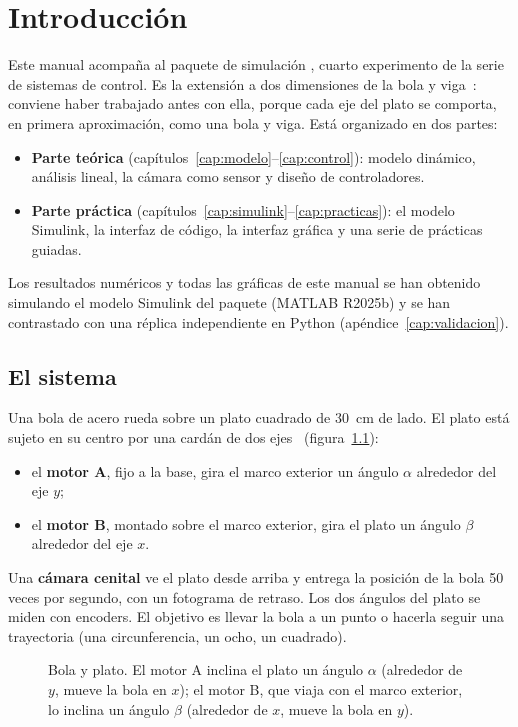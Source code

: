 \chapter{Introducción}
\label{cap:intro}

Este manual acompaña al paquete de simulación , cuarto experimento de la serie de sistemas de control. Es la extensión a dos dimensiones de la bola y viga~\cite{viga}: conviene haber trabajado antes con ella, porque cada eje del plato se comporta, en primera aproximación, como una bola y viga. Está organizado en dos partes:
\begin{itemize}
  \item \textbf{Parte teórica} (capítulos~\ref{cap:modelo}--\ref{cap:control}): modelo dinámico, análisis lineal, la cámara como sensor y diseño de controladores.
  \item \textbf{Parte práctica} (capítulos~\ref{cap:simulink}--\ref{cap:practicas}): el modelo Simulink, la interfaz de código, la interfaz gráfica y una serie de prácticas guiadas.
\end{itemize}
Los resultados numéricos y todas las gráficas de este manual se han obtenido simulando el modelo Simulink del paquete (MATLAB R2025b) y se han contrastado con una réplica independiente en Python (apéndice~\ref{cap:validacion}).

\section{El sistema}

Una bola de acero rueda sobre un plato cuadrado de \SI{30}{cm} de lado. El plato está sujeto en su centro por una cardán de dos ejes~\cite{awtar2002} (figura~\ref{fig:sistema}):
\begin{itemize}
  \item el \textbf{motor A}, fijo a la base, gira el marco exterior un ángulo $\alpha$ alrededor del eje $y$;
  \item el \textbf{motor B}, montado sobre el marco exterior, gira el plato un ángulo $\beta$ alrededor del eje $x$.
\end{itemize}
Una \textbf{cámara cenital} ve el plato desde arriba y entrega la posición de la bola 50 veces por segundo, con un fotograma de retraso. Los dos ángulos del plato se miden con encoders. El objetivo es llevar la bola a un punto o hacerla seguir una trayectoria (una circunferencia, un ocho, un cuadrado).

\begin{figure}[H]
\centering

\caption{Bola y plato. El motor A inclina el plato un ángulo $\alpha$ (alrededor de $y$, mueve la bola en $x$); el motor B, que viaja con el marco exterior, lo inclina un ángulo $\beta$ (alrededor de $x$, mueve la bola en $y$).}
\label{fig:sistema}
\end{figure}

